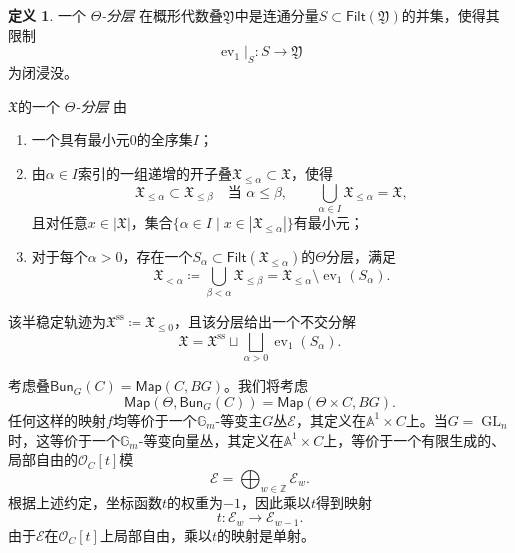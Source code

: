\documentclass{amsart}
\theoremstyle{definition}
\newtheorem{defn}[thm]{定义}
\theoremstyle{remark}
\theoremstyle{plain}
\theoremstyle{definition}
\theoremstyle{remark}
\newcommand{\A}{\mathbb{A}}
\newcommand{\G}{\mathbb{G}}
\newcommand{\Z}{\mathbb{Z}}
\newcommand{\mc}[1]{\mathcal{#1}}
\newcommand{\mf}[1]{\mathfrak{#1}}
\newcommand{\mr}[1]{\mathrm{#1}}
\newcommand{\on}[1]{\operatorname{#1}}
\newcommand{\ms}[1]{\mathsf{#1}}
\newcommand{\1}{\mathbf{1}}
\newcommand{\2}{\mathbf{2}}
\newcommand{\3}{\mathbf{3}}
\DeclareMathOperator{\ev}{ev}
\begin{document}
\begin{defn}
    一个 \textit{\(\Theta\)-分层 } 在概形代数叠\(\mf{Y}\)中是连通分量\(S\subset\ms{Filt}(\mf{Y})\)的并集，使得其限制
    \[
        \ev_1|_S\colon S\longrightarrow\mf{Y}
    \]
    为闭浸没。

    \(\mf{X}\)的一个 \textit{\(\Theta\)-分层 } 由
    \begin{enumerate}
\item 一个具有最小元\(0\)的全序集\(I\)；
\item 由\(\alpha\in I\)索引的一组递增的开子叠\(\mf{X}_{\leq\alpha}\subset\mf{X}\)，使得
        \[
            \mf{X}_{\leq\alpha}\subset\mf{X}_{\leq\beta}
            \quad\text{当 }\alpha\leq\beta,
            \qquad
            \bigcup_{\alpha\in I}\mf{X}_{\leq\alpha}=\mf{X},
        \]
        且对任意\(x\in|\mf{X}|\)，集合\(\{\alpha\in I\mid x\in|\mf{X}_{\leq\alpha}|\}\)有最小元；
\item 对于每个\(\alpha>0\)，存在一个\(S_\alpha\subset\ms{Filt}(\mf{X}_{\leq\alpha})\)的\(\Theta\)分层，满足
        \[
            \mf{X}_{<\alpha}
            \coloneqq
            \bigcup_{\beta<\alpha}\mf{X}_{\leq\beta}
            =
            \mf{X}_{\leq\alpha}\setminus\ev_1(S_\alpha).
        \]
    \end{enumerate}
    该半稳定轨迹为\(\mf{X}^{\mr{ss}}\coloneqq\mf{X}_{\leq0}\)，且该分层给出一个不交分解
    \[
        \mf{X}
        =
        \mf{X}^{\mr{ss}}
        \sqcup
        \bigsqcup_{\alpha>0}\ev_1(S_\alpha).
    \]
\end{defn}

考虑叠\(\ms{Bun}_G(C) = \ms{Map}(C, BG)\)。我们将考虑
\[ \ms{Map}(\Theta, \ms{Bun}_G(C)) = \ms{Map}(\Theta \times C, BG). \]
任何这样的映射\(f\)均等价于一个\(\G_m\)-等变主\(G\)丛\(\mc{E}\)，其定义在\(\A^1\times C\)上。当\(G=\on{GL}_n\)时，这等价于一个\(\G_m\)-等变向量丛，其定义在\(\A^1\times C\)上，等价于一个有限生成的、局部自由的\(\mc{O}_C[t]\)模
\[
    \mc{E}=\bigoplus_{w\in\Z}\mc{E}_w.
\]
根据上述约定，坐标函数\(t\)的权重为\(-1\)，因此乘以\(t\)得到映射
\[
    t\colon\mc{E}_w\longrightarrow\mc{E}_{w-1}.
\]
由于\(\mc{E}\)在\(\mc{O}_C[t]\)上局部自由，乘以\(t\)的映射是单射。
\end{document}

